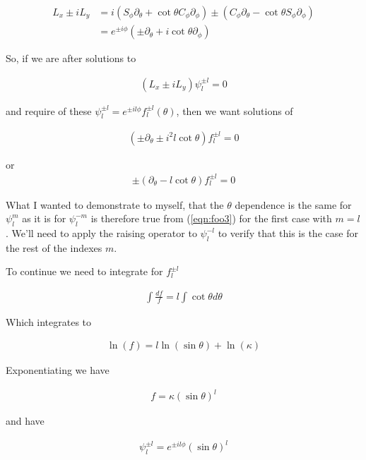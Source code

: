 \begin{align*}
L_x \pm iL_y
&= 
i (S_\phi \partial_\theta + \cot\theta C_\phi \partial_\phi)
\pm (C_\phi \partial_\theta - \cot\theta S_\phi \partial_\phi) \\
&= e^{\pm i\phi} (\pm \partial_\theta + i \cot\theta \partial_\phi )
\end{align*}

So, if we are after solutions to 

\begin{align}\label{eqn:foo1}
(L_x \pm iL_y) \psi_l^{\pm l} = 0
\end{align}

and require of these $\psi_l^{\pm l} = e^{\pm i l \phi} f_l^{\pm l}(\theta)$, then we want solutions of

\begin{align}\label{eqn:foo2}
(\pm \partial_\theta \pm i^2 l \cot\theta ) f_l^{\pm l} = 0
\end{align}

or
\begin{align}\label{eqn:foo3}
\pm (\partial_\theta - l \cot\theta ) f_l^{\pm l} = 0
\end{align}

What I wanted to demonstrate to myself, that the $\theta$ dependence is the same for $\psi_l^m$ as it is for $\psi_l^{-m}$ is therefore true from (\ref{eqn:foo3}) for the first case with $m=l$.  We'll need to apply the raising operator to $\psi_l^{-l}$ to verify that this is the case for the rest of the indexes $m$.

To continue we need to integrate for $f_l^{\pm l}$

\begin{align*}
\int \frac{d f}{f} = l \int \cot\theta d\theta
\end{align*}

Which integrates to

\begin{align*}
\ln(f) = l \ln(\sin\theta) + \ln(\kappa)
\end{align*}

Exponentiating we have

\begin{align*}
f = \kappa (\sin\theta)^l
\end{align*}

and have

\begin{align}\label{eqn:foo4}
\psi_l^{\pm l} = e^{\pm i l \phi} (\sin\theta)^l
\end{align}

